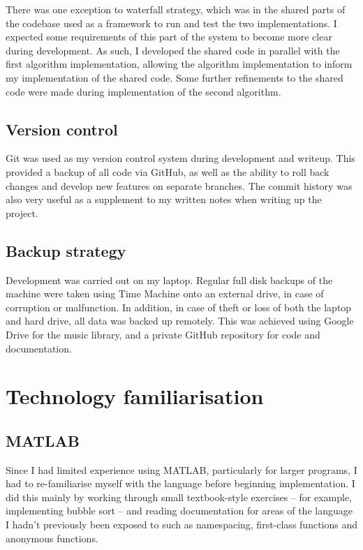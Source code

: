 \documentclass[12pt,a4paper,twoside,openright]{report}
\begin{document}
There was one exception to waterfall strategy, which was in the shared parts of the codebase used as a framework to run and test the two implementations. I expected some requirements of this part of the system to become more clear during development. As such, I developed the shared code in parallel with the first algorithm implementation, allowing the algorithm implementation to inform my implementation of the shared code. Some further refinements to the shared code were made during implementation of the second algorithm.


\subsection{Version control}

Git was used as my version control system during development and writeup. This provided a backup of all code via GitHub, as well as the ability to roll back changes and develop new features on separate branches. The commit history was also very useful as a supplement to my written notes when writing up the project.


\subsection{Backup strategy}

Development was carried out on my laptop. Regular full disk backups of the machine were taken using Time Machine onto an external drive, in case of corruption or malfunction. In addition, in case of theft or loss of both the laptop and hard drive, all data was backed up remotely. This was achieved using Google Drive for the music library, and a private GitHub repository for code and documentation.




\section{Technology familiarisation}

\subsection{MATLAB}

Since I had limited experience using MATLAB, particularly for larger programs, I had to re-familiarise myself with the language before beginning implementation. I did this mainly by working through small textbook-style exercises -- for example, implementing bubble sort -- and reading documentation for areas of the language I hadn't previously been exposed to such as namespacing, first-class functions and anonymous functions.
\end{document}
